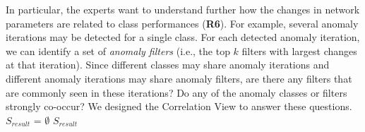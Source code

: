 \documentclass[format=acmsmall, review=false, screen=true]{acmart}
\newcommand{\ti}{\textcolor[rgb]{0,0,0}}
\begin{document}
In particular, the experts want to understand further how the changes in network parameters are related to class performances (\textbf{R6}).
For example, several anomaly iterations may be detected for a single class.
For each detected anomaly iteration, we can identify a set of \textit{anomaly filters} (i.e., the top $k$ filters with largest changes at that iteration).
Since different classes may share anomaly iterations and different anomaly iterations may share anomaly filters, are there any filters that are commonly seen in these iterations?
Do any of the anomaly classes or filters strongly co-occur?
We designed the Correlation View to answer these questions.
	\SetAlgoNoLine
	$S_{result}$ = $\emptyset$\;
	 $S_{result}$ \label{alg:setsplit:return}
\end{document}
